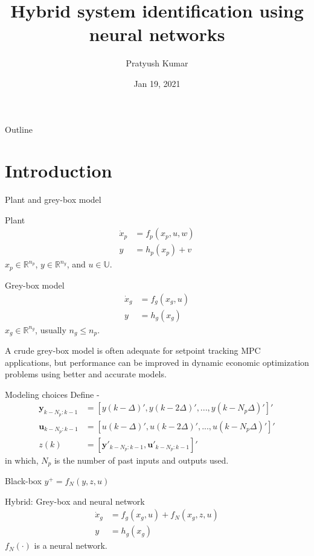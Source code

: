 \documentclass[xcolor=dvipsnames, 8pt]{beamer} %
\title{Hybrid system identification using neural networks}
\date{Jan 19, 2021}
\author[Pratyush Kumar]{\large Pratyush Kumar}
\institute[UCSB]{
	\begin{minipage}{4in}
		\vspace{-10pt}
		\centering
		\raisebox{-0.1\height}{\texttt{[image: UCSB\_seal]}}
	\end{minipage}
	\vspace{10pt}
	\newline
	{\large Department of chemical engineering}
	\vspace{10pt}
	\newline
	{\large Group talk}}
\newcommand{\bbR}{\mathbb{R}}
\newcommand{\bbU}{\mathbb{U}}
\begin{document}
\frame{\titlepage}
	
\begin{frame}{Outline}
\tableofcontents
\end{frame}

\section{Introduction}

\begin{frame}{Plant and grey-box model}

	\begin{block}{Plant}
		\begin{align*}
			\dot x_p &= f_p(x_p, u, w) \\
			y &= h_p(x_p) + v
		  \end{align*}
	$x_p \in \bbR^{n_p}$, $y \in \bbR^{n_y}$, and $u \in \bbU$.
	\end{block}
		
	\begin{block}{Grey-box model}
		\begin{align*}
			\dot x_g &= f_g(x_g, u) \\
			y &= h_g(x_g)
		  \end{align*}
	$x_g \in \bbR^{n_g}$, usually $n_g \leq n_p$.
	\end{block}
	A crude grey-box model is often adequate for setpoint tracking MPC applications, but performance can be improved in dynamic 
	economic optimization problems using better and accurate models. 
	\end{frame}
	
\begin{frame}{Modeling choices}
	Define - 
	\begin{align*}
	\mathbf{y}_{k-N_p:k-1} &= [y(k-\Delta)', y(k-2\Delta)', ..., y(k-N_p\Delta)']' \\
	\mathbf{u}_{k-N_p:k-1} &= [u(k-\Delta)', u(k-2\Delta)', 
										 ..., u(k-N_p\Delta)']' \\
	z(k) &= [\mathbf{y}'_{k-N_p:k-1}, \mathbf{u}'_{k-N_p:k-1}]'
	\end{align*}	
	in which, $N_p$ is the number of past inputs and outputs used. 
	\begin{block}{Black-box}
	$y^+ = f_N(y, z, u)$
	\end{block}
	
	\begin{block}{Hybrid: Grey-box and neural network}
		\begin{align*}
			\dot x_g &= f_g(x_g, u) + f_N(x_g, z, u)\\
			y &= h_g(x_g)
		\end{align*}
	$f_N(\cdot)$ is a neural network.
	\end{block}
			
\end{frame}
\end{document}
